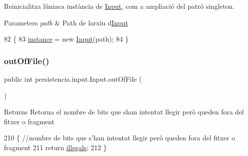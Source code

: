 Reinicialitza l\textquotesingle{}úniaca instància de \hyperlink{classpersistencia_1_1input_1_1Input}{Input}, com a ampliació del patró singleton. 


\begin{DoxyParams}{Parameters}
{\em path} & Path de l\textquotesingle{}arxiu d\textquotesingle{}\hyperlink{classpersistencia_1_1input_1_1Input}{Input} \\
\hline
\end{DoxyParams}

\begin{DoxyCode}
82                                                \{
83         \hyperlink{classpersistencia_1_1input_1_1Input_a2e516b1cbef9b704c10fd932b3d11afd}{instance} = \textcolor{keyword}{new} \hyperlink{classpersistencia_1_1input_1_1Input_a9b30ef8d489a1fc5b4aa04a14474349a}{Input}(path);
84     \}
\end{DoxyCode}
\mbox{\label{classpersistencia_1_1input_1_1Input_a3f0fc057e91430b81f5f2c92f91b8ed7}} 
\subsubsection{\texorpdfstring{out\+Of\+File()}{outOfFile()}}
{\footnotesize\ttfamily public int persistencia.\+input.\+Input.\+out\+Of\+File (\begin{DoxyParamCaption}{ }\end{DoxyParamCaption})\hspace{0.3cm}{\ttfamily [inline]}}

\begin{DoxyReturn}{Returns}
Retorna el nombre de bits que s\textquotesingle{}han intentat llegir però queden fora del fitxer o fragment 
\end{DoxyReturn}

\begin{DoxyCode}
210                            \{ \textcolor{comment}{//nombre de bits que s'han intentat llegir però queden fora del fitxer o
       fragment}
211         \textcolor{keywordflow}{return} \hyperlink{classpersistencia_1_1input_1_1Input_ad3132949d4ac469b5f4d77373389f9f1}{illegals};
212     \}
\end{DoxyCode}
\mbox{\label{classpersistencia_1_1input_1_1Input_a24eae4109b4ff4954ff2d7feef2fa4e4}} 
